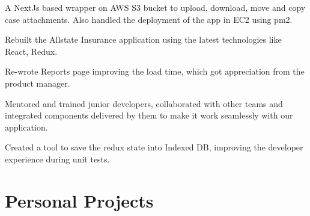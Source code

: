 \documentclass[]{deedy-resume-openfont}
\begin{document}
\begin{minipage}[t]{0.74\textwidth}
A NextJs based wrapper on AWS S3 bucket to upload, download, move and copy case
attachments. Also handled the deployment of the app in EC2 using pm2.
\smallskip
\sectionsep

\vspace{\topsep} %
Rebuilt the Allstate Insurance application using the latest technologies like React, Redux.
\begin{tightemize}
\item Re-wrote Reports page improving the load time, which got appreciation from the product manager.
\item Mentored and trained junior developers, collaborated with other teams and integrated components delivered by them to make it work seamlessly with our application. 
\item Created a tool to save the redux state into Indexed DB, improving the developer experience during unit tests.
\end{tightemize}
\sectionsep

\sectionsep

\section{Personal Projects}
\begin{tabular}{cl}


\end{tabular}
\end{minipage}
\end{document}
